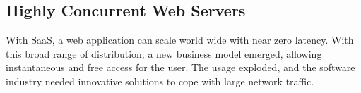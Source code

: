 



\subsection{Highly Concurrent Web Servers}

With SaaS, a web application can scale world wide with near zero latency. %
With this broad range of distribution, a new business model emerged, allowing instantaneous and free access for the user.
The usage exploded, and the software industry needed innovative solutions to cope with large network traffic.



